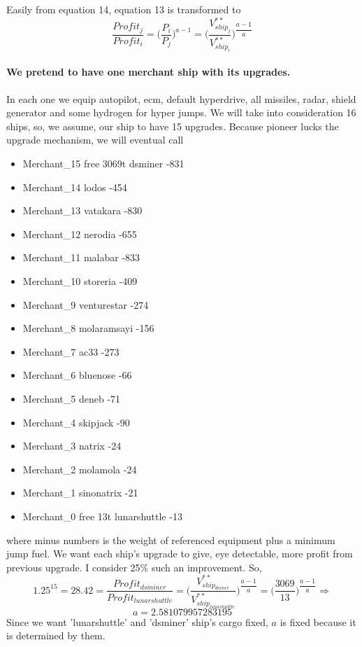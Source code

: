 \documentclass[]{article}
\begin{document}
	Easily from equation 14, equation 13 is transformed to
	\begin{equation}\label{eq:profitRatio_ij}
		\dfrac{Profit_{j}}{Profit_{i}}=\Big(\dfrac{P_{i}}{P_{j}}\Big)^{a-1}=\Big(\dfrac{V^{**}_{ship_{j}}}{V^{**}_{ship_{i}}}\Big)^{\dfrac{a-1}{a}}
	\end{equation}
\paragraph{We pretend to have one merchant ship with its upgrades.} In each one we equip autopilot, ecm, default hyperdrive, all missiles, radar, shield generator and some hydrogen for hyper jumps. We will take into consideration 16 ships, so, we assume, our ship  to have 15 upgrades.
Because pioneer lucks the upgrade mechanism, we will eventual call 
\begin{itemize}
\item Merchant\_15 free 3069t	dsminer -831
\item Merchant\_14 	lodos -454
\item Merchant\_13 	vatakara -830
\item Merchant\_12	nerodia -655
\item Merchant\_11	malabar -833
\item Merchant\_10	storeria -409
\item Merchant\_9	venturestar -274
\item Merchant\_8	molaramsayi -156
\item Merchant\_7	ac33 -273
\item Merchant\_6 	bluenose -66
\item Merchant\_5	deneb -71
\item Merchant\_4	skipjack -90
\item Merchant\_3	natrix -24
\item Merchant\_2	molamola -24
\item Merchant\_1	sinonatrix -21
\item Merchant\_0 free 13t	lunarshuttle -13
\end{itemize}
where minus numbers is the weight of referenced equipment plus a minimum jump fuel.
We want each ship's upgrade to give, eye detectable, more profit from previous upgrade. I consider 25\% such an improvement. So, \[1.25^{15}=28.42=\frac{Profit_{dsminer}}{Profit_{lunarshuttle}}=\Big(\dfrac{V^{**}_{ship_{dsiner}}}{V^{**}_{ship_{lunashuttle}}}\Big)^{\dfrac{a-1}{a}}=\Big(\dfrac{3069}{13}\Big)^{\dfrac{a-1}{a}}\Rightarrow\]\[a=2.581079957283195\]
Since we want 'lunarshuttle' and 'dsminer' ship's cargo fixed, $a$ is fixed because it is determined by them.
\end{document}
